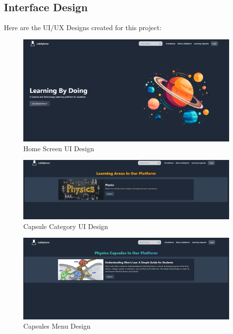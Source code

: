 \subsection{Interface Design}
Here are the UI/UX Designs created for this project:
\begin{figure}[H]
   \centering
    \includegraphics[width = 15cm]{Diagrams/interface/home ui.png}
    \caption{Home Screen UI Design}
\end{figure}
\begin{figure}[H]
    \centering
     \includegraphics[width = 15cm]{Diagrams/interface/capsule category ui.png}
     \caption{Capsule Category UI Design}
 \end{figure}
 \begin{figure}[H]
    \centering
     \includegraphics[width = 15cm]{Diagrams/interface/Capsules.png}
     \caption{Capsules Menu Design}
 \end{figure}
\newpage
